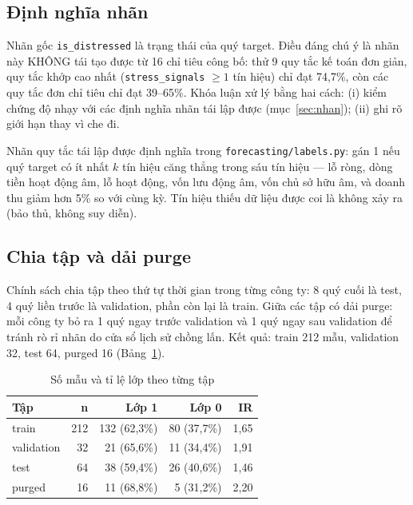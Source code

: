\subsection{Định nghĩa nhãn}

Nhãn gốc \texttt{is\_distressed} là trạng thái của quý target. Điều đáng chú ý là nhãn này KHÔNG tái
tạo được từ 16 chỉ tiêu công bố: thử 9 quy tắc kế toán đơn giản, quy tắc khớp cao nhất
(\texttt{stress\_signals} $\geq 1$ tín hiệu) chỉ đạt 74,7\%, còn các quy tắc đơn chỉ tiêu chỉ đạt
39--65\%. Khóa luận xử lý bằng hai cách: (i) kiểm chứng độ nhạy với các định nghĩa nhãn tái lập được
(mục~\ref{sec:nhan}); (ii) ghi rõ giới hạn thay vì che đi.

Nhãn quy tắc tái lập được định nghĩa trong \texttt{forecasting/labels.py}: gán 1 nếu quý target có
ít nhất $k$ tín hiệu căng thẳng trong sáu tín hiệu — lỗ ròng, dòng tiền hoạt động âm, lỗ hoạt động,
vốn lưu động âm, vốn chủ sở hữu âm, và doanh thu giảm hơn 5\% so với cùng kỳ. Tín hiệu thiếu dữ liệu
được coi là không xảy ra (bảo thủ, không suy diễn).

\subsection{Chia tập và dải purge}

Chính sách chia tập theo thứ tự thời gian trong từng công ty: 8 quý cuối là test, 4 quý liền trước là
validation, phần còn lại là train. Giữa các tập có dải purge: mỗi công ty bỏ ra 1 quý ngay trước
validation và 1 quý ngay sau validation để tránh rò rỉ nhãn do cửa sổ lịch sử chồng lấn. Kết quả:
train 212 mẫu, validation 32, test 64, purged 16 (Bảng~\ref{tab:split}).

\begin{table}[H]
\centering
\caption{Số mẫu và tỉ lệ lớp theo từng tập}
\label{tab:split}
\begin{tabular}{|l|r|r|r|r|}
\hline
\textbf{Tập} & \textbf{n} & \textbf{Lớp 1} & \textbf{Lớp 0} & \textbf{IR} \\
\hline
train      & 212 & 132 (62,3\%) & 80 (37,7\%)  & 1,65 \\
validation & 32  & 21 (65,6\%)  & 11 (34,4\%)  & 1,91 \\
test       & 64  & 38 (59,4\%)  & 26 (40,6\%)  & 1,46 \\
purged     & 16  & 11 (68,8\%)  & 5 (31,2\%)   & 2,20 \\
\hline
\end{tabular}
\end{table}

